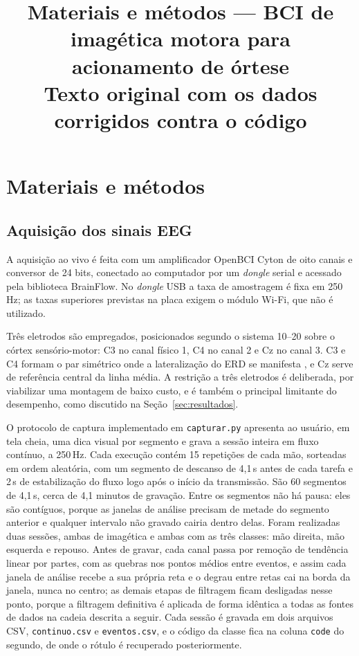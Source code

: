 \documentclass[12pt,a4paper]{article}
\title{\vspace{-1.5cm}\large Materiais e métodos --- BCI de imagética motora para
acionamento de órtese\\[4pt]
\normalsize\normalfont Texto original com os dados corrigidos contra o código}
\author{}
\date{}
\begin{document}
\maketitle
\vspace{-1.2cm}

\section{Materiais e métodos}\label{sec:metodologia}


\subsection{Aquisição dos sinais EEG}\label{subsec:aquisicao}

A aquisição ao vivo é feita com um amplificador OpenBCI Cyton de oito canais e conversor de
24 bits, conectado ao computador por um \textit{dongle} serial e acessado pela biblioteca
BrainFlow. No \textit{dongle} USB a taxa de amostragem é fixa em 250\,Hz; as taxas superiores
previstas na placa exigem o módulo Wi-Fi, que não é utilizado.

Três eletrodos são empregados, posicionados segundo o sistema 10--20 sobre o córtex
sensório-motor: C3 no canal físico 1, C4 no canal 2 e Cz no canal 3. C3 e C4 formam o par
simétrico onde a lateralização do ERD se manifesta \cite{pfurtscheller1999}, e Cz serve de
referência central da linha média. A restrição a três eletrodos é deliberada, por viabilizar
uma montagem de baixo custo, e é também o principal limitante do desempenho, como discutido
na Seção~\ref{sec:resultados}.

O protocolo de captura implementado em \texttt{capturar.py} apresenta ao usuário, em tela
cheia, uma dica visual por segmento e grava a sessão inteira em fluxo contínuo, a 250\,Hz.
Cada execução contém 15 repetições de cada mão, sorteadas em ordem aleatória, com um
segmento de descanso de 4,1\,s antes de cada tarefa e 2\,s de estabilização do fluxo logo
após o início da transmissão. São 60 segmentos de 4,1\,s, cerca de 4,1 minutos de gravação.
Entre os segmentos não há pausa: eles são contíguos, porque as janelas de análise precisam de
metade do segmento anterior e qualquer intervalo não gravado cairia dentro delas. Foram
realizadas duas sessões, ambas de imagética e ambas com as três classes: mão direita, mão
esquerda e repouso. Antes de gravar, cada canal passa por remoção de tendência linear por
partes, com as quebras nos pontos médios entre eventos, e assim cada janela de análise
recebe a sua própria reta e o degrau entre retas cai na borda da janela, nunca no centro; as
demais etapas de filtragem ficam desligadas nesse ponto, porque a filtragem definitiva é
aplicada de forma idêntica a todas as fontes de dados na cadeia descrita a seguir. Cada
sessão é gravada em dois arquivos CSV, \texttt{continuo.csv} e \texttt{eventos.csv}, e o
código da classe fica na coluna \texttt{code} do segundo, de onde o rótulo é recuperado
posteriormente.
\end{document}
